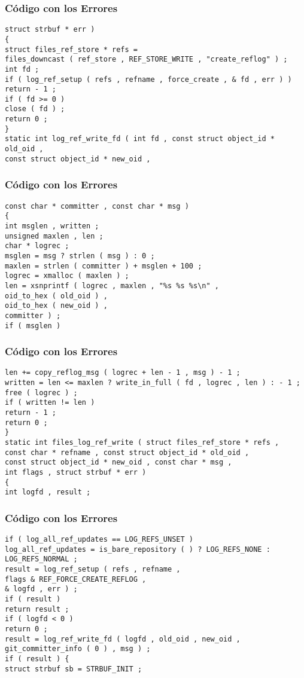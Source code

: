 \documentclass{beamer}
\begin{document}
\begin{frame}[fragile]
\frametitle{C\'odigo con los Errores}
\begin{verbatim}
struct strbuf * err ) 
{ 
struct files_ref_store * refs = 
files_downcast ( ref_store , REF_STORE_WRITE , "create_reflog" ) ; 
int fd ; 
if ( log_ref_setup ( refs , refname , force_create , & fd , err ) ) 
return - 1 ; 
if ( fd >= 0 ) 
close ( fd ) ; 
return 0 ; 
} 
static int log_ref_write_fd ( int fd , const struct object_id * old_oid , 
const struct object_id * new_oid , 
\end{verbatim}
\end{frame}
\begin{frame}[fragile]
\frametitle{C\'odigo con los Errores}
\begin{verbatim}
const char * committer , const char * msg ) 
{ 
int msglen , written ; 
unsigned maxlen , len ; 
char * logrec ; 
msglen = msg ? strlen ( msg ) : 0 ; 
maxlen = strlen ( committer ) + msglen + 100 ; 
logrec = xmalloc ( maxlen ) ; 
len = xsnprintf ( logrec , maxlen , "%s %s %s\n" , 
oid_to_hex ( old_oid ) , 
oid_to_hex ( new_oid ) , 
committer ) ; 
if ( msglen ) 
\end{verbatim}
\end{frame}
\begin{frame}[fragile]
\frametitle{C\'odigo con los Errores}
\begin{verbatim}
len += copy_reflog_msg ( logrec + len - 1 , msg ) - 1 ; 
written = len <= maxlen ? write_in_full ( fd , logrec , len ) : - 1 ; 
free ( logrec ) ; 
if ( written != len ) 
return - 1 ; 
return 0 ; 
} 
static int files_log_ref_write ( struct files_ref_store * refs , 
const char * refname , const struct object_id * old_oid , 
const struct object_id * new_oid , const char * msg , 
int flags , struct strbuf * err ) 
{ 
int logfd , result ; 
\end{verbatim}
\end{frame}
\begin{frame}[fragile]
\frametitle{C\'odigo con los Errores}
\begin{verbatim}
if ( log_all_ref_updates == LOG_REFS_UNSET ) 
log_all_ref_updates = is_bare_repository ( ) ? LOG_REFS_NONE : LOG_REFS_NORMAL ; 
result = log_ref_setup ( refs , refname , 
flags & REF_FORCE_CREATE_REFLOG , 
& logfd , err ) ; 
if ( result ) 
return result ; 
if ( logfd < 0 ) 
return 0 ; 
result = log_ref_write_fd ( logfd , old_oid , new_oid , 
git_committer_info ( 0 ) , msg ) ; 
if ( result ) { 
struct strbuf sb = STRBUF_INIT ; 
\end{verbatim}
\end{frame}
\end{document}
